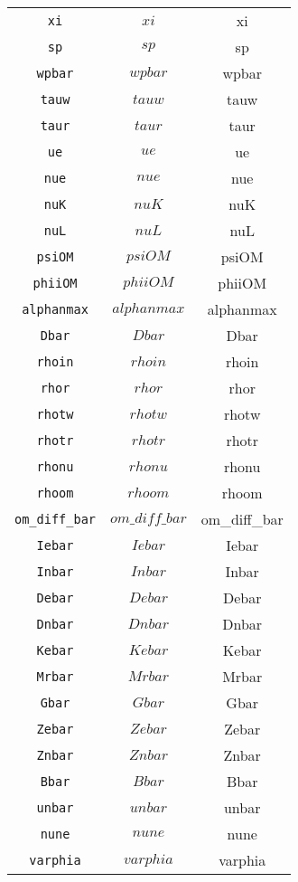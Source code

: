 \begin{center}
\begin{longtable}{ccc}
\texttt{xi} & $xi$ & xi\\
\texttt{sp} & $sp$ & sp\\
\texttt{wpbar} & $wpbar$ & wpbar\\
\texttt{tauw} & $tauw$ & tauw\\
\texttt{taur} & $taur$ & taur\\
\texttt{ue} & $ue$ & ue\\
\texttt{nue} & $nue$ & nue\\
\texttt{nuK} & $nuK$ & nuK\\
\texttt{nuL} & $nuL$ & nuL\\
\texttt{psiOM} & $psiOM$ & psiOM\\
\texttt{phiiOM} & $phiiOM$ & phiiOM\\
\texttt{alphanmax} & $alphanmax$ & alphanmax\\
\texttt{Dbar} & $Dbar$ & Dbar\\
\texttt{rhoin} & $rhoin$ & rhoin\\
\texttt{rhor} & $rhor$ & rhor\\
\texttt{rhotw} & $rhotw$ & rhotw\\
\texttt{rhotr} & $rhotr$ & rhotr\\
\texttt{rhonu} & $rhonu$ & rhonu\\
\texttt{rhoom} & $rhoom$ & rhoom\\
\texttt{om\_diff\_bar} & $om\_diff\_bar$ & om\_diff\_bar\\
\texttt{Iebar} & $Iebar$ & Iebar\\
\texttt{Inbar} & $Inbar$ & Inbar\\
\texttt{Debar} & $Debar$ & Debar\\
\texttt{Dnbar} & $Dnbar$ & Dnbar\\
\texttt{Kebar} & $Kebar$ & Kebar\\
\texttt{Mrbar} & $Mrbar$ & Mrbar\\
\texttt{Gbar} & $Gbar$ & Gbar\\
\texttt{Zebar} & $Zebar$ & Zebar\\
\texttt{Znbar} & $Znbar$ & Znbar\\
\texttt{Bbar} & $Bbar$ & Bbar\\
\texttt{unbar} & $unbar$ & unbar\\
\texttt{nune} & $nune$ & nune\\
\texttt{varphia} & $varphia$ & varphia\\
\hline%
\end{longtable}
\end{center}
